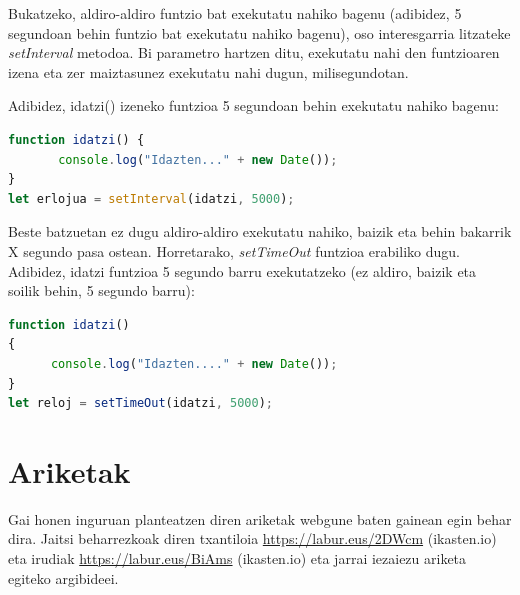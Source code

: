 Bukatzeko, aldiro-aldiro funtzio bat exekutatu nahiko bagenu (adibidez, 5 segundoan behin funtzio bat exekutatu nahiko bagenu), oso interesgarria litzateke \textit{setInterval} metodoa. Bi parametro hartzen ditu, exekutatu nahi den funtzioaren izena eta zer maiztasunez exekutatu nahi dugun, milisegundotan.

Adibidez, idatzi() izeneko funtzioa 5 segundoan behin exekutatu nahiko bagenu:
\begin{lstlisting}[language=JavaScript]
function idatzi() {
       console.log("Idazten..." + new Date());
}
let erlojua = setInterval(idatzi, 5000);
\end{lstlisting}

Beste batzuetan ez dugu aldiro-aldiro exekutatu nahiko, baizik eta behin bakarrik X segundo pasa ostean. Horretarako, \textit{setTimeOut} funtzioa erabiliko dugu. Adibidez, idatzi funtzioa 5 segundo barru exekutatzeko (ez aldiro, baizik eta soilik behin, 5 segundo barru):

\begin{minipage}{\linewidth}
\begin{lstlisting}[language=JavaScript]
function idatzi()
{
      console.log("Idazten...." + new Date());
}
let reloj = setTimeOut(idatzi, 5000);
\end{lstlisting}
\end{minipage}

\section{Ariketak}

Gai honen inguruan planteatzen diren ariketak webgune baten gainean egin behar dira. Jaitsi beharrezkoak diren txantiloia \href{https://www.ikasten.io/html5/ariketak/fitxategiak/06_txantiloia.zip}{https://labur.eus/2DWcm} (ikasten.io) eta  irudiak \href{https://www.ikasten.io/html5/ariketak/fitxategiak/06_irudiak.zip}{https://labur.eus/BiAms} (ikasten.io) eta jarrai iezaiezu ariketa egiteko argibideei.

